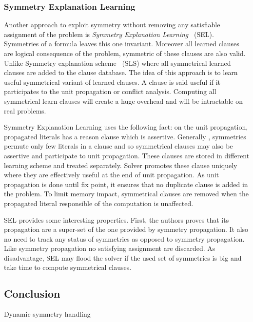 \subsubsection{Symmetry Explanation Learning}


Another approach to exploit symmetry without removing any satisfiable assignment of the problem
is \emph{Symmetry Explanation Learning}~\cite{devriendt2017symmetric} (SEL). 
Symmetries of a formula leaves this one invariant. Moreover all learned clauses are logical consequence of the problem, symmetric of these clauses are also valid.
Unlike Symmetry explanation scheme~\cite{benhamou2010enhancing} (SLS) where all symmetrical learned clauses
are added to the clause database.
The idea of this approach is to learn useful symmetrical variant of learned clauses.
 A clause is said useful if it participates to the unit propagation or conflict analysis.
Computing all symmetrical learn clauses will create a huge overhead and will be intractable 
on real problems.

Symmetry Explanation Learning uses the following fact:
on the unit propagation, propagated literals has a reason clause which is assertive.
Generally , symmetries permute only few literals in a clause and so symmetrical clauses may
also be assertive and participate to unit propagation.
 These clauses are stored in different learning scheme and 
treated separately. Solver promotes these clause  uniquely where they are effectively useful
at the end of unit propagation. As unit propagation is done until fix point, it
ensures that no duplicate clause is added in the problem.
To limit memory impact, symmetrical clauses are removed when the propagated literal 
responsible of the computation is unaffected.

SEL provides some interesting properties. First, the authors proves that its propagation are a super-set of the one provided by symmetry propagation. It also no need to track any status of 
symmetries as opposed to symmetry propagation. Like symmetry propagation no satisfying assignment are discarded.
As disadvantage, SEL may flood the solver if the used set of symmetries is big and take time 
to compute symmetrical clauses. 


\subsection{Conclusion}

Dynamic symmetry handling 



